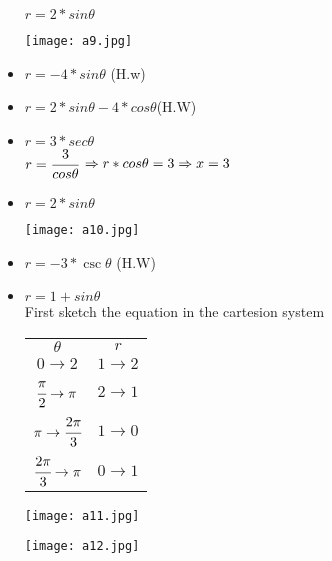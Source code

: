 \begin{example}
\begin{itemize}
\begin{minipage}{0.6\textwidth}
$r=2*sin\theta$
\end{minipage}
\begin{minipage}{0.5\textwidth}
\texttt{[image: a9.jpg]}\\
\end{minipage}
\item $r=-4*sin\theta$ (H.w)
\item $r=2*sin\theta-4*cos\theta$(H.W)
\item $r=3*sec\theta$\\ $r=\cfrac{3}{cos\theta}$ $\Rightarrow r*cos\theta =3\\ \Rightarrow x=3$
\item 
\begin{minipage}{0.6\textwidth}
$r=2*sin\theta$
\end{minipage}
\begin{minipage}{0.5\textwidth}
\texttt{[image: a10.jpg]}\\
\end{minipage}
\item $r=-3*\csc\theta$ (H.W)
\item $r=1+sin\theta$\\First sketch the equation in the cartesion system \\
\begin{minipage}{0.32\textwidth}
	\begin{tabular}{ |c | c |  }
	\hline
	$\theta$ & $r$ \\
{\color{red}$0 \rightarrow 2$} & {\color{red} $1 \rightarrow 2$} \\
{\color{red} $\cfrac{\pi}{2} \rightarrow \pi $} & {\color{red}$2 \rightarrow 1$} \\
{\color{red}$\pi \rightarrow \cfrac{2\pi}{3}$} & {\color{red}$1 \rightarrow 0$}\\
{\color{red}$\cfrac{2\pi}{3}\rightarrow \pi $ } & {\color{red}$0 \rightarrow 1$}
	\end{tabular}
\end{minipage}
\begin{minipage}{0.32\textwidth}
\texttt{[image: a11.jpg]}
\end{minipage}
\begin{minipage}{0.32\textwidth}
\texttt{[image: a12.jpg]}
\end{minipage}

\end{itemize}
\end{example}
